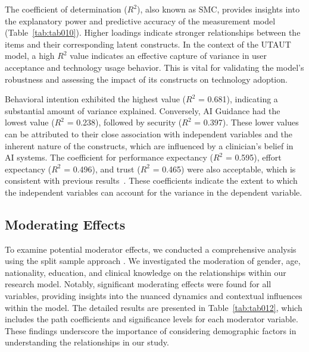 

\clearpage



\clearpage

The coefficient of determination ($R^2$), also known as \ac{SMC}, provides insights into the explanatory power and predictive accuracy of the measurement model \textcolor{revised}{(Table~\ref{tab:tab010})}.
Higher loadings indicate stronger relationships between the items and their corresponding latent constructs.
\textcolor{revised}{In the context of the \ac{UTAUT} model, a high $R^2$ value indicates an effective capture of variance in user acceptance and technology usage behavior.
This is vital for validating the model's robustness and assessing the impact of its constructs on technology adoption.}

Behavioral intention exhibited the highest value ($R^2$ = 0.681), indicating a substantial amount of variance explained.
Conversely, \ac{AI} Guidance had the lowest value ($R^2$ = 0.238), followed by security ($R^2$ = 0.397).
These lower values can be attributed to their close association with independent variables and the inherent nature of the constructs, which are influenced by a clinician's belief in \ac{AI} systems.
The coefficient for performance expectancy ($R^2$ = 0.595), effort expectancy ($R^2$ = 0.496), and trust ($R^2$ = 0.465) were also acceptable, which is consistent with previous results~\cite{KHALILZADEH2017460}.
These coefficients indicate the extent to which the independent variables can account for the variance in the dependent variable.

\subsection{Moderating Effects}
\label{sec:chap004005005}

To examine potential moderator effects, we conducted a comprehensive analysis using the split sample approach \cite{LI2021106581, LI2021106929}.
We investigated the moderation of gender, age, nationality, education, and clinical knowledge on the relationships within our research model.
Notably, significant moderating effects were found for all variables, providing insights into the nuanced dynamics and contextual influences within the model.
The detailed results are presented in Table~\ref{tab:tab012}, which includes the path coefficients and significance levels for each moderator variable.
These findings underscore the importance of considering demographic factors in understanding the relationships in our study.

